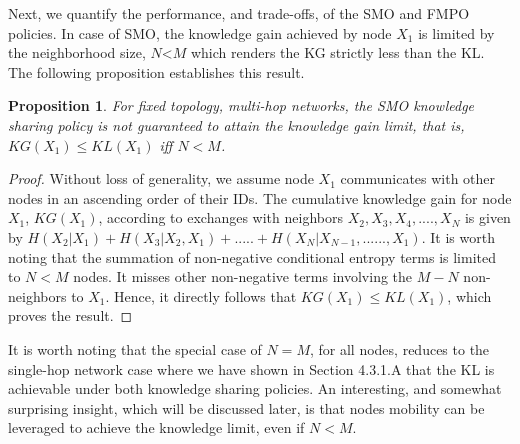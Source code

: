 \documentclass[12pt,epsf]{article}
\newtheorem{prop}{Proposition}
\theoremstyle{definition}
\begin{document}
Next, we quantify the performance, and trade-offs, of the SMO and FMPO policies. In case of
SMO, the knowledge gain achieved by node $X_1$ is limited by the neighborhood size, $N$<$M$ which renders the KG strictly less than the KL. The following proposition establishes this result.
\vspace{-0.2 cm}
\begin{prop}
For fixed topology, multi-hop networks, the SMO knowledge sharing policy is not guaranteed to attain the knowledge gain limit, that is, $KG(X_1) \le KL(X_1)$ iff $N<M$.
\end{prop}
%
\vspace{-0.4 cm}
\begin{proof}
Without loss of generality, we assume node $X_1$ communicates with other nodes in an ascending order of their IDs. The cumulative knowledge gain for node $X_1$, $KG(X_1)$, according to exchanges with neighbors $X_2, X_3, X_4,...., X_{N}$ is given by $H(X_2|X_1) + H(X_3|X_2,X_1) + .....+ H(X_{N}|X_{N-1}, ......, X_1)$. It is worth noting that the summation of non-negative conditional entropy terms is limited to $N<M$ nodes. It misses other non-negative terms involving the $M-N$ non-neighbors to $X_1$. Hence, it directly follows that $KG(X_1) \le KL(X_1)$, which proves the result.
%
\end{proof}
%
\vspace{-0.5 cm}
It is worth noting that the special case of $N=M$, for all nodes, reduces to the single-hop network case where we have shown in Section 4.3.1.A that the KL is achievable under both knowledge sharing policies.
%
%
An interesting, and somewhat surprising insight, which will be discussed later, is that nodes mobility can be leveraged to achieve the knowledge limit, even if $N<M$.

\end{document}
